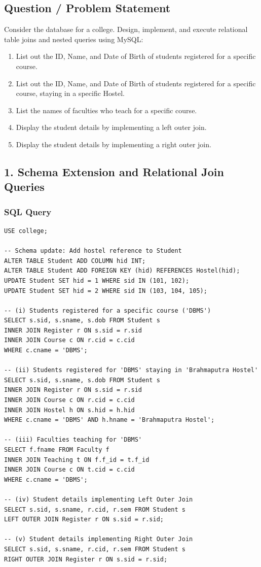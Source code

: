 \subsection*{Question / Problem Statement}
Consider the database for a college. Design, implement, and execute relational table joins and nested queries using MySQL:
\begin{enumerate}[noitemsep,topsep=2pt]
    \item[(i)] List out the ID, Name, and Date of Birth of students registered for a specific course.
    \item[(ii)] List out the ID, Name, and Date of Birth of students registered for a specific course, staying in a specific Hostel.
    \item[(iii)] List the names of faculties who teach for a specific course.
    \item[(iv)] Display the student details by implementing a left outer join.
    \item[(v)] Display the student details by implementing a right outer join.
\end{enumerate}

\subsection*{1. Schema Extension and Relational Join Queries}

\subsubsection*{SQL Query}
\begin{lstlisting}[basicstyle=\ttfamily\footnotesize,caption={Schema alteration, multi-table inner joins, and outer joins (Queries i--v)}]
USE college;

-- Schema update: Add hostel reference to Student
ALTER TABLE Student ADD COLUMN hid INT;
ALTER TABLE Student ADD FOREIGN KEY (hid) REFERENCES Hostel(hid);
UPDATE Student SET hid = 1 WHERE sid IN (101, 102);
UPDATE Student SET hid = 2 WHERE sid IN (103, 104, 105);

-- (i) Students registered for a specific course ('DBMS')
SELECT s.sid, s.sname, s.dob FROM Student s
INNER JOIN Register r ON s.sid = r.sid
INNER JOIN Course c ON r.cid = c.cid
WHERE c.cname = 'DBMS';

-- (ii) Students registered for 'DBMS' staying in 'Brahmaputra Hostel'
SELECT s.sid, s.sname, s.dob FROM Student s
INNER JOIN Register r ON s.sid = r.sid
INNER JOIN Course c ON r.cid = c.cid
INNER JOIN Hostel h ON s.hid = h.hid
WHERE c.cname = 'DBMS' AND h.hname = 'Brahmaputra Hostel';

-- (iii) Faculties teaching for 'DBMS'
SELECT f.fname FROM Faculty f
INNER JOIN Teaching t ON f.f_id = t.f_id
INNER JOIN Course c ON t.cid = c.cid
WHERE c.cname = 'DBMS';

-- (iv) Student details implementing Left Outer Join
SELECT s.sid, s.sname, r.cid, r.sem FROM Student s
LEFT OUTER JOIN Register r ON s.sid = r.sid;

-- (v) Student details implementing Right Outer Join
SELECT s.sid, s.sname, r.cid, r.sem FROM Student s
RIGHT OUTER JOIN Register r ON s.sid = r.sid;
\end{lstlisting}

